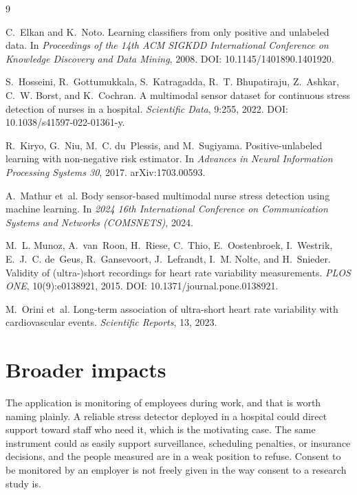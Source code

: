 \begin{thebibliography}{9}

C.~Elkan and K.~Noto.
\newblock Learning classifiers from only positive and unlabeled data.
\newblock In \emph{Proceedings of the 14th ACM SIGKDD International Conference
  on Knowledge Discovery and Data Mining}, 2008.
\newblock DOI: 10.1145/1401890.1401920.

S.~Hosseini, R.~Gottumukkala, S.~Katragadda, R.~T. Bhupatiraju, Z.~Ashkar,
  C.~W. Borst, and K.~Cochran.
\newblock A multimodal sensor dataset for continuous stress detection of nurses
  in a hospital.
\newblock \emph{Scientific Data}, 9:255, 2022.
\newblock DOI: 10.1038/s41597-022-01361-y.

R.~Kiryo, G.~Niu, M.~C. du~Plessis, and M.~Sugiyama.
\newblock Positive-unlabeled learning with non-negative risk estimator.
\newblock In \emph{Advances in Neural Information Processing Systems 30}, 2017.
\newblock arXiv:1703.00593.

A.~Mathur et~al.
\newblock Body sensor-based multimodal nurse stress detection using machine
  learning.
\newblock In \emph{2024 16th International Conference on Communication Systems
  and Networks (COMSNETS)}, 2024.

M.~L. Munoz, A.~van~Roon, H.~Riese, C.~Thio, E.~Oostenbroek, I.~Westrik,
  E.~J.~C. de~Geus, R.~Gansevoort, J.~Lefrandt, I.~M. Nolte, and H.~Snieder.
\newblock Validity of (ultra-)short recordings for heart rate variability
  measurements.
\newblock \emph{PLOS ONE}, 10(9):e0138921, 2015.
\newblock DOI: 10.1371/journal.pone.0138921.

M.~Orini et~al.
\newblock Long-term association of ultra-short heart rate variability with
  cardiovascular events.
\newblock \emph{Scientific Reports}, 13, 2023.

\end{thebibliography}


\newpage

\appendix

\section{Broader impacts}

The application is monitoring of employees during work, and that is worth
naming plainly. A reliable stress detector deployed in a hospital could direct
support toward staff who need it, which is the motivating case. The same
instrument could as easily support surveillance, scheduling penalties, or
insurance decisions, and the people measured are in a weak position to refuse.
Consent to be monitored by an employer is not freely given in the way consent
to a research study is.

